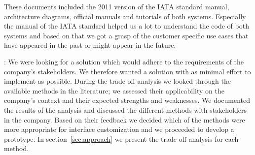 These documents included the 2011 version of the IATA standard manual, architecture diagrams, official manuals and tutorials of both systems. Especially the manual of the IATA standard helped us a lot to understand the code of both systems and based on that we got a grasp of the customer specific use cases that have appeared in the past or might appear in the future.



{}: 
We were looking for a solution which would adhere to the requirements of the company's stakeholders. We therefore wanted a solution with as minimal effort to implement as possible. During the trade off analysis we looked through the available methods in the literature; we assessed their applicability on the company's context and their expected strengths and weaknesses. 
We documented the results of the analysis and discussed the different methods with stakeholders in the company. Based on their feedback we decided which of the methods were more appropriate for interface customization and we proceeded to develop a prototype. 
In section~\ref{sec:approach} we present the trade off analysis for each method. 

